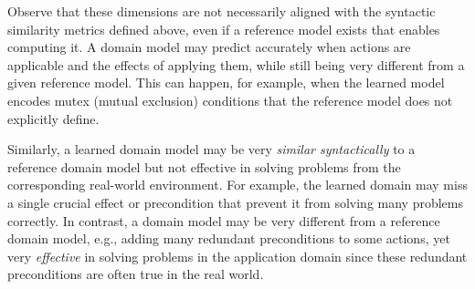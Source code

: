 \documentclass{article}
\theoremstyle{definition}
\theoremstyle{remark}
\newif\ifaddcomments
\newcommand{\roni}[1]{\ifaddcomments{\textcolor{red}{[Roni: #1]}}\fi}
\newcommand{\yarin}[1]{\ifaddcomments{\textcolor{teal}{[Yarin: #1]}}\fi}
\newcommand{\gregor}[1]{\ifaddcomments{\textcolor{orange}{[Gregor: #1]}}\fi}
\begin{document}
Observe that these dimensions are not necessarily aligned with the syntactic similarity metrics defined above, even if a reference model exists that enables computing it.  
A domain model may predict accurately when actions are applicable and the effects of applying them, while still being very different from a given reference model. 
This can happen, for example, when the learned model encodes mutex (mutual exclusion) conditions that the reference model does not explicitly define.
\gregor{maybe: ``does only define implicitly''?} 
\gregor{I've also put this issue already in the example above. Is this more illustrative?}
Similarly, a learned domain model may be very \emph{similar syntactically} to a reference domain model but not effective in solving problems from the corresponding real-world environment. 
For example, the learned domain may miss a single crucial effect or precondition that prevent it from solving many problems correctly. 
In contrast, a domain model may be very different from a reference domain model, e.g., adding many redundant preconditions to some actions, yet very \emph{effective} in solving problems in the application domain since these redundant preconditions are often true in the real world. 
\end{document}

